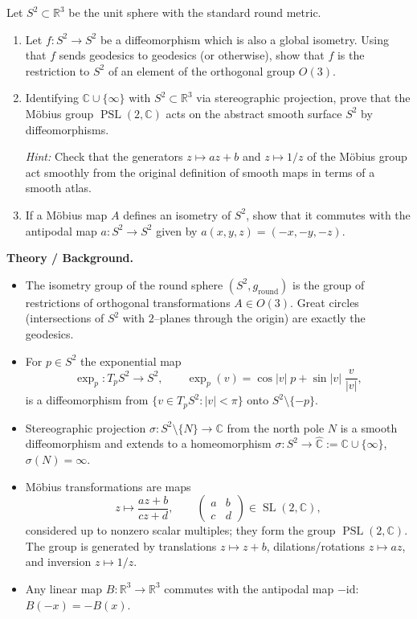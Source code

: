 \begin{problem}
\label{prob:cp-vii-0079}
Let $S^{2}\subset\mathbb{R}^{3}$ be the unit sphere with the standard round metric.
	
	\begin{enumerate}
		\item Let $f:S^{2}\to S^{2}$ be a diffeomorphism which is also a global isometry.
		Using that $f$ sends geodesics to geodesics (or otherwise), show that
		$f$ is the restriction to $S^{2}$ of an element of the orthogonal group $O(3)$.
		\item Identifying $\mathbb{C}\cup\{\infty\}$ with $S^{2}\subset\mathbb{R}^{3}$ via stereographic projection,
		prove that the M\"obius group $\operatorname{PSL}(2,\mathbb{C})$ acts on the abstract smooth surface $S^{2}$ by diffeomorphisms.
		
		\emph{Hint:} Check that the generators $z\mapsto az+b$ and $z\mapsto 1/z$ of the M\"obius group
		act smoothly from the original definition of smooth maps in terms of a smooth atlas.
		\item If a M\"obius map $A$ defines an isometry of $S^{2}$, show that it commutes with the antipodal map
		$a:S^{2}\to S^{2}$ given by $a(x,y,z)=(-x,-y,-z)$.
	\end{enumerate}
	
	\par\medskip\noindent\textbf{Theory / Background.}\par\smallskip

	
	\begin{itemize}
		\item The isometry group of the round sphere $(S^{2},g_{\mathrm{round}})$ is the group of restrictions of
		orthogonal transformations $A\in O(3)$.
		Great circles (intersections of $S^{2}$ with $2$--planes through the origin) are exactly the geodesics.
		\item For $p\in S^{2}$ the exponential map
		\[
		\exp_p:T_pS^{2}\to S^{2},\qquad
		\exp_p(v)=\cos |v|\;p+\sin |v|\;\frac{v}{|v|},
		\]
		is a diffeomorphism from $\{v\in T_pS^{2}:|v|<\pi\}$ onto $S^{2}\setminus\{-p\}$.
		\item Stereographic projection $\sigma:S^{2}\setminus\{N\}\to\mathbb{C}$ from the north pole $N$ is a smooth diffeomorphism
		and extends to a homeomorphism $\sigma:S^{2}\to\hat{\mathbb{C}}:=\mathbb{C}\cup\{\infty\}$, $\sigma(N)=\infty$.
		\item M\"obius transformations are maps
		\[
		z\longmapsto \frac{az+b}{cz+d},\qquad
		\begin{pmatrix}a&b\\c&d\end{pmatrix}\in\operatorname{SL}(2,\mathbb{C}),
		\]
		considered up to nonzero scalar multiples; they form the group $\operatorname{PSL}(2,\mathbb{C})$.
		The group is generated by translations $z\mapsto z+b$, dilations/rotations $z\mapsto az$, and inversion $z\mapsto 1/z$.
		\item Any linear map $B:\mathbb{R}^{3}\to\mathbb{R}^{3}$ commutes with the antipodal map $-\mathrm{id}$:
		$B(-x)=-B(x)$.
	\end{itemize}
\end{problem}

